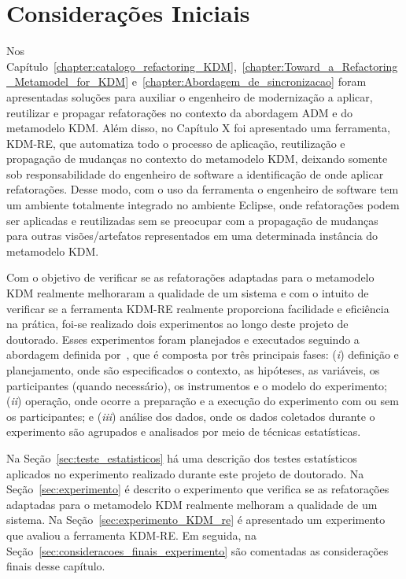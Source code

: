 \section{Considerações Iniciais}

Nos Capítulo~\ref{chapter:catalogo_refactoring_KDM},~\ref{chapter:Toward_a_Refactoring_Metamodel_for_KDM} e~\ref{chapter:Abordagem_de_sincronizacao} foram apresentadas soluções para auxiliar o engenheiro de modernização a aplicar, reutilizar e propagar refatorações no contexto da abordagem ADM e do metamodelo KDM. Além disso, no Capítulo X foi apresentado uma ferramenta, KDM-RE, que automatiza todo o processo de aplicação, reutilização e propagação de mudanças no contexto do metamodelo KDM, deixando somente sob responsabilidade do engenheiro de software a identificação de onde aplicar refatorações. Desse modo, com o uso da ferramenta o engenheiro de software tem um ambiente totalmente integrado no ambiente Eclipse, onde refatorações podem ser aplicadas e reutilizadas sem se preocupar com a propagação de mudanças para outras visões/artefatos representados em uma determinada instância do metamodelo KDM.

Com o objetivo de verificar se as refatorações adaptadas para o metamodelo KDM realmente melhoraram a qualidade de um sistema e com o intuito de verificar se a ferramenta KDM-RE realmente proporciona facilidade e eficiência na prática, foi-se realizado dois experimentos ao longo deste projeto de doutorado. Esses experimentos foram planejados e executados seguindo a abordagem definida por~, que é composta por três principais fases: (\textit{i}) definição e planejamento, onde são especificados o contexto, as hipóteses, as variáveis, os participantes (quando necessário), os instrumentos e o modelo do experimento; (\textit{ii}) operação, onde ocorre a preparação e a execução do experimento com ou sem os participantes; e (\textit{iii}) análise dos dados, onde os dados coletados durante o experimento são agrupados e analisados por meio de técnicas estatísticas.

Na Seção~\ref{sec:teste_estatisticos} há uma descrição dos testes estatísticos aplicados no experimento realizado durante este projeto de doutorado. Na Seção~\ref{sec:experimento} é descrito o experimento que verifica se as refatorações adaptadas para o metamodelo KDM realmente melhoram a qualidade de um sistema. Na Seção~\ref{sec:experimento_KDM_re} é apresentado um experimento que avaliou a ferramenta KDM-RE. Em seguida, na Seção~\ref{sec:consideracoes_finais_experimento} são comentadas as considerações finais desse capítulo.

